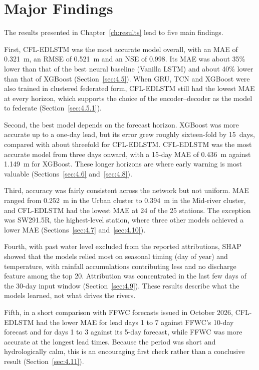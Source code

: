 \section{Major Findings}
\label{sec:5.3}

The results presented in Chapter~\ref{ch:results} lead to five main findings.

First, CFL-EDLSTM was the most accurate model overall, with an MAE of 0.321~m,
an RMSE of 0.521~m and an NSE of 0.998. Its MAE was about 35\% lower than that
of the best neural baseline (Vanilla LSTM) and about 40\% lower than that of
XGBoost (Section~\ref{sec:4.5}). When GRU, TCN and XGBoost were also trained in
clustered federated form, CFL-EDLSTM still had the lowest MAE at every horizon,
which supports the choice of the encoder--decoder as the model to federate
(Section~\ref{sec:4.5.1}).

Second, the best model depends on the forecast horizon. XGBoost was more
accurate up to a one-day lead, but its error grew roughly sixteen-fold by
15~days, compared with about threefold for CFL-EDLSTM. CFL-EDLSTM was the most
accurate model from three days onward, with a 15-day MAE of 0.436~m against
1.149~m for XGBoost. These longer horizons are where early warning is most
valuable (Sections~\ref{sec:4.6} and~\ref{sec:4.8}).

Third, accuracy was fairly consistent across the network but not uniform. MAE
ranged from 0.252~m in the Urban cluster to 0.394~m in the Mid-river cluster,
and CFL-EDLSTM had the lowest MAE at 24 of the 25 stations. The exception was
SW291.5R, the highest-level station, where three other models achieved a lower
MAE (Sections~\ref{sec:4.7} and~\ref{sec:4.10}).

Fourth, with past water level excluded from the reported attributions, SHAP
showed that the models relied most on seasonal timing (day of year) and
temperature, with rainfall accumulations contributing less and no discharge
feature among the top 20. Attribution was concentrated in the last few days of
the 30-day input window (Section~\ref{sec:4.9}). These results describe what the
models learned, not what drives the rivers.

Fifth, in a short comparison with FFWC forecasts issued in October 2026,
CFL-EDLSTM had the lower MAE for lead days 1 to 7 against FFWC's 10-day forecast
and for days 1 to 3 against its 5-day forecast, while FFWC was more accurate at
the longest lead times. Because the period was short and hydrologically calm,
this is an encouraging first check rather than a conclusive result
(Section~\ref{sec:4.11}).

